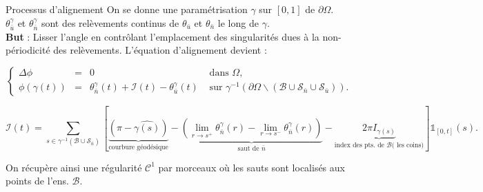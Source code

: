 \documentclass[compress,10pt,aspectratio=169]{beamer}
\begin{document}
\begin{frame}{Processus d'alignement}
\small
\vspace{-0.4cm}
On se donne une paramétrisation \(\gamma\) sur \([0, 1]\) de \(\partial\Omega\).\\\vspace{0.12cm}
\(\theta_{\bar{u}}^\gamma\) et \(\theta_{\bar{n}}^\gamma\) sont des relèvements continus de \(\theta_{\bar{u}}\) et \(\theta_{\bar{n}}\) le long de \(\gamma\).\\\vspace{0.12cm}
\textbf{But} : Lisser l'angle en contrôlant l'emplacement des singularités dues à la non-périodicité des relèvements. L'équation d'alignement devient :\\\vspace{0.12cm}

\begin{equation*}
\left\{
\begin{array}{lcll}
\Delta\phi &=& 0 &\mbox{ dans } \Omega,\\[0.4cm]
\phi(\gamma(t)) &=& \theta_{\bar{n}}^\gamma(t) + \mathcal{I}(t) - \theta_{\bar{u}}^\gamma(t) & \mbox{ sur } \gamma^{-1}(\partial\Omega \backslash (\mathcal{B} \cup \mathcal{S}_{\bar{n}} \cup \mathcal{S}_{\bar{u}})).
\end{array}
\right.
\end{equation*}

\begin{equation*}
\mathcal{I}(t) = \sum_{s \in \gamma^{-1}(\mathcal{B} \cup \mathcal{S}_{\bar{n}})} \left[\underbrace{\left(\pi - \widehat{\gamma(s)}\right)}_{\text{courbure géodésique}} - \underbrace{\left(\lim\limits_{r \rightarrow s^+}\theta^{\gamma}_{\bar{n}}(r) - \lim\limits_{r \rightarrow s^-}\theta^{\gamma}_{\bar{n}}(r)\right)}_{\text{saut de }\bar{n}} - \underbrace{2\pi I_{\gamma(s)}}_{\text{index des pts. de }\mathcal{B}\text{( les coins)}}\right] \mathbb{1}_{[0, t]}(s).
\end{equation*}

On récupère ainsi une régularité \(\mathcal{C}^1\) par morceaux où les sauts sont localisés aux points de l'ens. \(\mathcal{B}\).

\end{frame}
\end{document}
